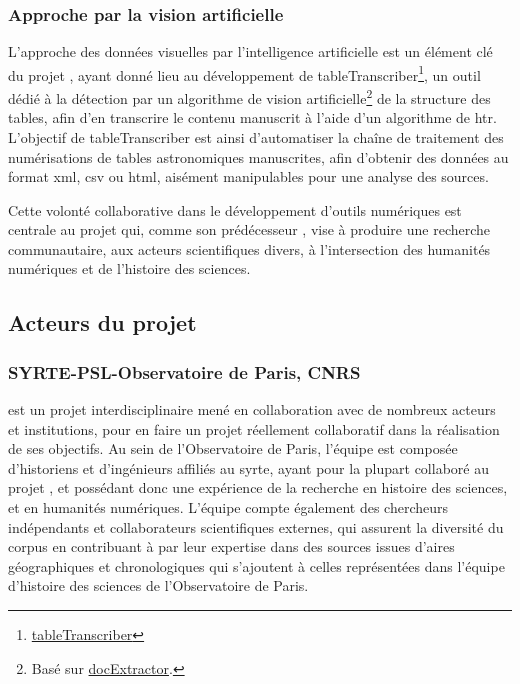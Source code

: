         \subsubsection{Approche par la vision artificielle}
L’approche des données visuelles par l’intelligence artificielle est un élément clé du projet \dishas, ayant donné lieu au développement de tableTranscriber\footnote{\href{https://github.com/tristandot/tableTranscriber}{tableTranscriber}}, un outil dédié à la détection par un algorithme de vision artificielle\footnote{Basé sur \href{https://github.com/monniert/docExtractor}{docExtractor}.} de la structure des tables, afin d’en transcrire le contenu manuscrit à l'aide d'un algorithme de \acrshort{htr}. L’objectif de tableTranscriber est ainsi d’automatiser la chaîne de traitement des numérisations de tables astronomiques manuscrites, afin d’obtenir des données au format \acrshort{xml}, \acrshort{csv} ou \acrshort{html}, aisément manipulables pour une analyse des sources. 

Cette volonté collaborative dans le développement d’outils numériques est centrale au projet \eida qui, comme son prédécesseur \dishas, vise à produire une recherche communautaire, aux acteurs scientifiques divers, à l’intersection des humanités numériques et de l’histoire des sciences.

    \subsection{Acteurs du projet}
        \subsubsection{SYRTE-PSL-Observatoire de Paris, CNRS}
\eida est un projet interdisciplinaire mené en collaboration avec de nombreux acteurs et institutions, pour en faire un projet réellement collaboratif dans la réalisation de ses objectifs. Au sein de l'Observatoire de Paris, l'équipe est composée d'historiens et d'ingénieurs affiliés au \acrfull{syrte}, ayant pour la plupart collaboré au projet \dishas, et possédant donc une expérience de la recherche en histoire des sciences, et en humanités numériques. L'équipe compte également des chercheurs indépendants et collaborateurs scientifiques externes, qui assurent la diversité du corpus en contribuant à \eida par leur expertise dans des sources issues d'aires géographiques et chronologiques qui s'ajoutent à celles représentées dans l'équipe d'histoire des sciences de l'Observatoire de Paris.

